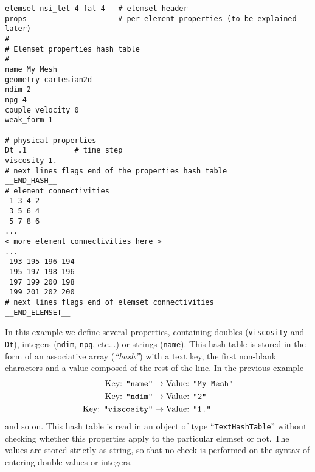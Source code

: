 \begin{verbatim}
elemset nsi_tet 4 fat 4   # elemset header 
props                     # per element properties (to be explained later)
#
# Elemset properties hash table
#
name My Mesh
geometry cartesian2d
ndim 2
npg 4
couple_velocity 0
weak_form 1

# physical properties
Dt .1           # time step
viscosity 1.
# next lines flags end of the properties hash table
__END_HASH__
# element connectivities
 1 3 4 2
 3 5 6 4
 5 7 8 6
...
< more element connectivities here >
...
 193 195 196 194
 195 197 198 196
 197 199 200 198
 199 201 202 200
# next lines flags end of elemset connectivities
__END_ELEMSET__
\end{verbatim}

In this example we define several properties, containing doubles
(\verb+viscosity+ and \verb+Dt+), integers (\verb+ndim+, \verb+npg+,
etc...) or strings (\verb+name+). This hash table is stored in the
form of an associative array (\emph{``hash''}) with a text key, the
first non-blank characters and a value composed of the rest of the
line. In the previous example
%
\begin{equation}
\begin{aligned}
  \textrm{Key: {\tt "name"}} &\to \textrm{Value: {\tt "My Mesh"}}\\
  \textrm{Key: {\tt "ndim"}} &\to \textrm{Value: {\tt "2"}}\\
  \textrm{Key: {\tt "viscosity"}} &\to \textrm{Value: {\tt "1."}}
\end{aligned}
\end{equation}
%
and so on. This hash table is read in an object of type
``\verb+TextHashTable+'' without checking whether this properties apply
to the particular elemset or not. The values are stored strictly as
string, so that no check is performed on the syntax of entering double
values or integers. 


